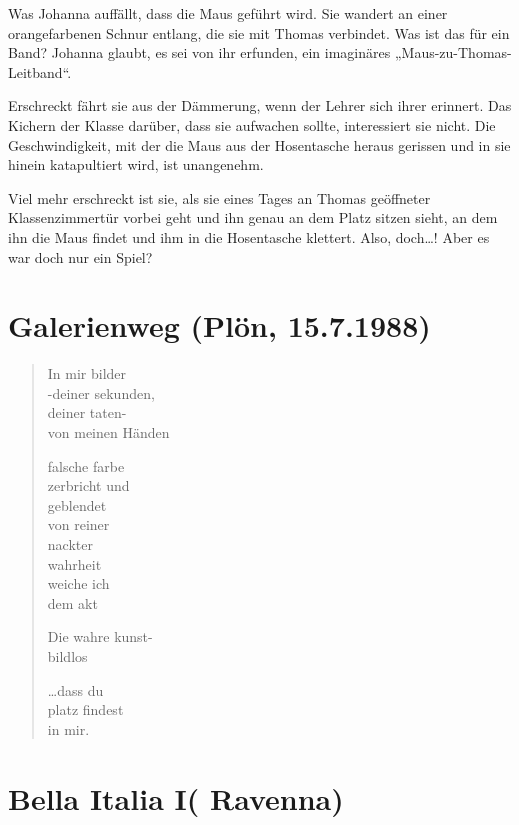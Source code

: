 \documentclass[10pt,a5paper]{book}
\begin{document}
Was Johanna auffällt, dass die Maus geführt wird. Sie wandert an einer orangefarbenen Schnur entlang, die sie mit Thomas verbindet. Was ist das für ein Band? Johanna glaubt, es sei von ihr erfunden, ein imaginäres „Maus-zu-Thomas-Leitband“.

Erschreckt fährt sie aus der Dämmerung, wenn der Lehrer sich ihrer erinnert.  Das Kichern der Klasse darüber, dass sie aufwachen sollte, interessiert sie nicht. Die Geschwindigkeit, mit der die Maus aus der Hosentasche heraus gerissen und in sie hinein katapultiert wird, ist unangenehm. 

Viel mehr erschreckt ist sie, als sie eines Tages an Thomas geöffneter Klassenzimmertür vorbei geht und ihn genau an dem Platz sitzen sieht, an dem ihn die Maus findet und ihm in die Hosentasche klettert. Also, doch\dots ! Aber es war doch nur ein Spiel?



\section*{Galerienweg (Plön, 15.7.1988)}

\begin{verse}
In mir bilder\\
-deiner sekunden,\\
deiner taten-\\
von meinen Händen


falsche farbe\\
zerbricht
und \\
geblendet\\
von reiner\\
nackter\\
wahrheit\\
weiche ich\\
	dem akt
	

Die wahre kunst-\\
bildlos


\dots dass du\\
platz findest\\
	in mir.
\end{verse}	
	
	
\section*{ Bella Italia I( Ravenna)}
	
	
	
\end{document}

